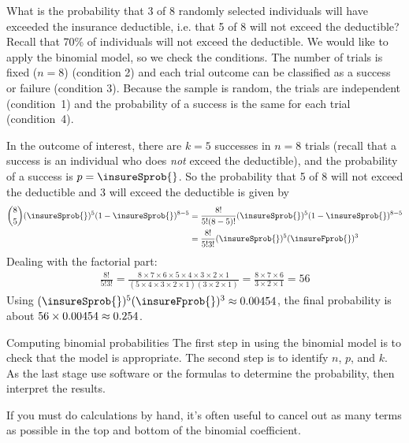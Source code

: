 \begin{examplewrap}
\begin{nexample}{What is the probability that 3 of 8 randomly
    selected individuals will have exceeded the insurance
    deductible, i.e. that 5 of 8 will not exceed the deductible?
    Recall that 70\% of individuals will not exceed the
    deductible.}
  We would like to apply the binomial model,
  so we check the conditions.
  The number of trials is fixed ($n = 8$) (condition 2)
  and each trial outcome can be classified as a success
  or failure (condition 3).
  Because the sample is random, the trials are independent
  (condition~1) and the probability of a success is the same
  for each trial (condition~4).

  In the outcome of interest, there are $k = 5$ successes
  in $n = 8$ trials (recall that a success is an individual
  who does \emph{not} exceed the deductible), and the
  probability of a success is $p = \insureSprob{}$.
  So the probability that 5 of 8 will not exceed the
  deductible and 3 will exceed the deductible is given by
  \begin{align*}
  { 8 \choose 5}(\insureSprob{})^5
  (1-\insureSprob{})^{8-5}
    &= \frac{8!}{5!(8-5)!}
        (\insureSprob{})^5(1-\insureSprob{})^{8-5} \\
    &= \frac{8!}{5!3!}
        (\insureSprob{})^5(\insureFprob{})^3
  \end{align*}
  Dealing with the factorial part:
  \begin{align*}
  \frac{8!}{5!3!}
    = \frac{8\times7\times6\times5\times4\times3\times2\times1}
        {(5\times4\times3\times2\times1)(3\times2\times1)}
    = \frac{8\times7\times6}{3\times2\times1}
    = 56
  \end{align*}
  Using $(\insureSprob{})^5(\insureFprob{})^3
    \approx \insureBinomEinHSingleScenario{}$,
  the final probability is about
  $56 \times 0.00454{}
    \approx 0.254{}$.
\end{nexample}
\end{examplewrap}

\begin{onebox}{Computing binomial probabilities}
  The first step in using the binomial model is to check
  that the model is appropriate.
  The second step is to identify $n$, $p$, and $k$.
  As the last stage use software or the formulas
  to determine the probability, then interpret the results.%
  \vspace{3mm}

  If you must do calculations by hand, it's often useful
  to cancel out as many terms as possible in the top and
  bottom of the binomial coefficient.
\end{onebox}

